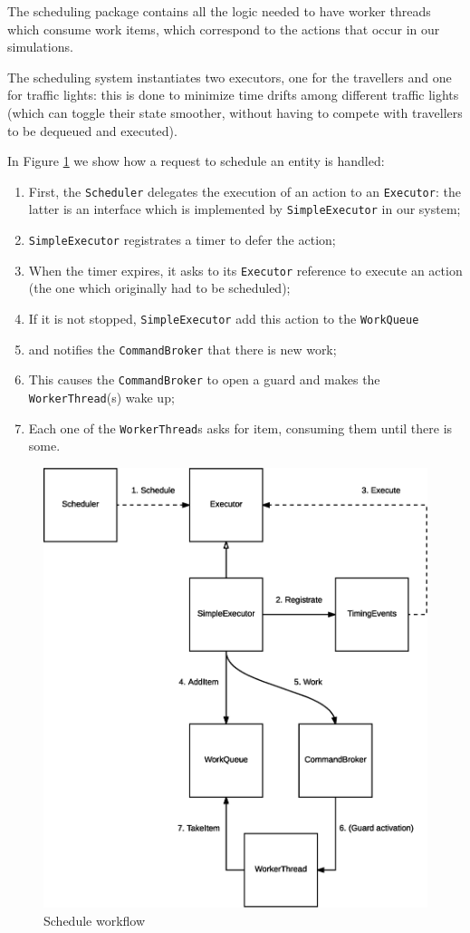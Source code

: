 The scheduling package contains all the logic needed to have worker threads
which consume work items, which correspond to the actions that occur in our
simulations.

The scheduling system instantiates two executors, one for the travellers and
one for traffic lights: this is done to minimize time drifts among different
traffic lights (which can toggle their state smoother, without having to
compete with travellers to be dequeued and executed).

In Figure \ref{fig:schedule-workflow} we show how a request to schedule an
entity is handled:

\begin{enumerate}
  \item First, the \texttt{Scheduler} delegates the execution of an action to an
    \texttt{Executor}: the latter is an interface which is implemented by
    \texttt{SimpleExecutor} in our system;
  \item \texttt{SimpleExecutor} registrates a timer to defer the action;
  \item When the timer expires, it asks to its \texttt{Executor} reference to
    execute an action (the one which originally had to be scheduled);
  \item If it is not stopped, \texttt{SimpleExecutor} add this action to the
    \texttt{WorkQueue}
  \item and notifies the \texttt{CommandBroker} that there is new work;
  \item This causes the \texttt{CommandBroker} to open a guard and makes the
    \texttt{WorkerThread}(s) wake up;
  \item Each one of the \texttt{WorkerThread}s asks for item, consuming them
    until there is some.
\end{enumerate}

\begin{figure}[H]
\centering
\includegraphics[scale=0.4,keepaspectratio]{images/solution/app/backend/scheduler.eps}
\caption{Schedule workflow}
\label{fig:schedule-workflow}
\end{figure}

